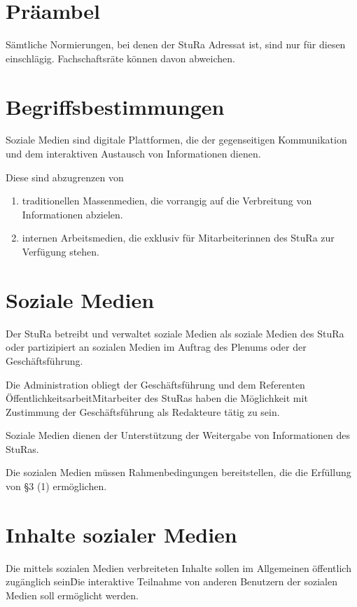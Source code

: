 \setcounter{section}{0}
\begin{multicols}{2}

\section{Präambel}
\Abs \Satz Sämtliche Normierungen, bei denen der StuRa Adressat ist, sind nur für diesen einschlägig. \Satz Fachschaftsräte können davon abweichen.

\section{Begriffsbestimmungen}
\Abs \Satz Soziale Medien sind digitale Plattformen, die der gegenseitigen Kommunikation und dem interaktiven Austausch von Informationen dienen.

\Abs \Satz Diese sind abzugrenzen von
\begin{enumerate}
\item traditionellen Massenmedien, die vorrangig auf die Verbreitung von Informationen abzielen. 
\item internen Arbeitsmedien, die exklusiv für Mitarbeiterinnen des StuRa zur Verfügung stehen.
\end{enumerate}

\section {Soziale Medien}
\Abs \Satz Der StuRa betreibt und verwaltet soziale Medien als soziale Medien des StuRa oder partizipiert an sozialen Medien im Auftrag des Plenums oder der Geschäftsführung.

\Abs \Satz Die Administration obliegt der Geschäftsführung und dem Referenten Öffentlichkeitsarbeit\. Mitarbeiter des StuRas haben die Möglichkeit mit Zustimmung der Geschäftsführung als Redakteure tätig zu sein.

\Abs \Satz Soziale Medien dienen der Unterstützung der Weitergabe von Informationen des StuRas.

\Abs \Satz Die sozialen Medien müssen Rahmenbedingungen bereitstellen, die die Erfüllung von §3 (1) ermöglichen.

\section {Inhalte sozialer Medien}
\Abs \Satz Die mittels sozialen Medien verbreiteten Inhalte sollen im Allgemeinen öffentlich zugänglich sein\. Die interaktive Teilnahme von anderen Benutzern der sozialen Medien soll ermöglicht werden.


\end{multicols}
